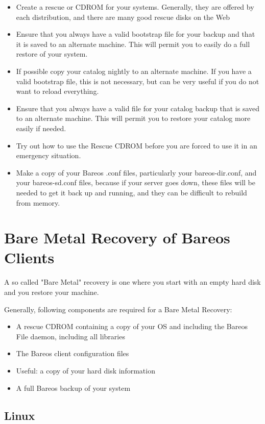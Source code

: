 \begin{itemize}
\item Create a rescue or CDROM for your systems. Generally,
   they are offered by each distribution, and there are many good
   rescue disks on the Web
\item Ensure that you always have a valid bootstrap file for your backup and
   that it is saved to an alternate machine.  This will permit you to
   easily do a full restore of your system.
\item If possible copy your catalog nightly to an alternate machine.  If you
   have a valid bootstrap file, this is not necessary, but  can be very useful if
   you do not want to reload everything.
\item Ensure that you always have a valid  file for your  catalog
   backup that is saved to an alternate machine. This will  permit you to restore
   your catalog more easily if needed.
\item Try out how to use the Rescue CDROM before you are forced to use it
    in an emergency situation.
\item Make a copy of your Bareos .conf files, particularly your
   bareos-dir.conf, and your bareos-sd.conf files, because if your server
   goes down, these files will be needed to get it back up and running,
   and they can be difficult to rebuild from memory.
\end{itemize}


\section{Bare Metal Recovery of Bareos Clients}
\label{baremetal_restore_client}

A so called "Bare Metal" recovery is one where you start with an empty hard
disk and you restore your machine.

Generally, following components are required for a Bare Metal Recovery:
\begin{itemize}
\item A rescue CDROM containing a copy of your OS and including the Bareos File daemon, including all libraries
\item The Bareos client configuration files
\item Useful: a copy of your hard disk information
\item A full Bareos backup of your system
\end{itemize}


\subsection{Linux}

